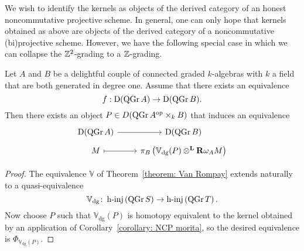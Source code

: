 We wish to identify the kernels as objects of the derived category of an honest noncommutative projective scheme.
In general, one can only hope that kernels obtained as above are objects of the derived category of a noncommutative (bi)projective scheme.
However, we have the following special case in which we can collapse the \(\mathbb{Z}^2\)-grading to a \(\mathbb{Z}\)-grading.

\begin{corollary} \label{corollary: NCP morita degree 1}
  Let \(A\) and \(B\) be a delightful couple of connected graded \(k\)-algebras with \(k\) a field that are both generated in degree one.
  Assume that there exists an equivalence
  \begin{displaymath}
    f : \mathrm{D} (\operatorname{QGr}A) \to \mathrm{D} (\operatorname{QGr}B).
  \end{displaymath}
  Then there exists an object \(P \in D ( \operatorname{QGr}A^{\operatorname{op}} \times_k B )\) that induces an equivalence
  \[\begin{tikzcd}[row sep=tiny]
  \mathrm{D}(\QGr{A}) \arrow{r}& \mathrm{D}(\QGr{B})\\
  M \arrow[mapsto]{r} & \pi_B\left(\mathbb{V}_\text{dg}(P) \otimes^\mathbf{L} \mathbf{R}\omega_A M\right)
  \end{tikzcd}\]
\end{corollary}

\begin{proof}
  The equivalence \(\mathbb{V}\) of Theorem~\ref{theorem: Van Rompay} extends naturally to a quasi-equivalence
  \[\mathbb{V}_\text{dg} \colon \operatorname{h-inj}\left(\operatorname{QGr}S\right) \to \operatorname{h-inj}\left(\operatorname{QGr}T\right).\]
  Now choose \(P\) such that \(\mathbb{V}_\text{dg}(P)\) is homotopy equivalent to the kernel obtained by an application of Corollary~\ref{corollary: NCP morita}, so the desired equivalence is \(\Phi_{\mathbb{V}_\text{dg}(P)}\).
\end{proof}
